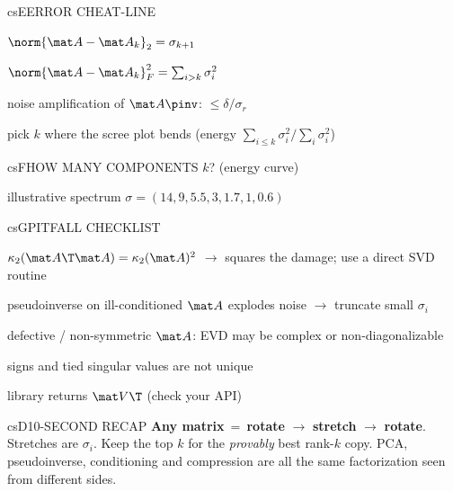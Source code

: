 \documentclass[../../../../master.tex]{subfiles}
\begin{document}
\begin{cscolumns}
\begin{cscard}{csE}{ERROR CHEAT-LINE}
  \begin{csbul}
    \item $\norm{\mat A-\mat A_k}_2=\sigma_{k+1}$
    \item $\norm{\mat A-\mat A_k}_F^2=\sum_{i>k}\sigma_i^2$
    \item noise amplification of $\mat A\pinv$: $\le\delta/\sigma_r$
    \item pick $k$ where the scree plot bends (energy $\sum_{i\le k}\sigma_i^2/\sum_i\sigma_i^2$)
  \end{csbul}
\end{cscard}

\begin{cscard}{csF}{HOW MANY COMPONENTS $k$?  (energy curve)}
  \centering
  \par
  {\scriptsize illustrative spectrum $\sigma=(14,9,5.5,3,1.7,1,0.6)$}
\end{cscard}
\columnbreak

\begin{cscard}{csG}{PITFALL CHECKLIST}
  \begin{csbul}
    \item $\kappa_2(\mat A\T\mat A)=\kappa_2(\mat A)^2$ $\to$ squares the damage; use a direct SVD routine
    \item pseudoinverse on ill-conditioned $\mat A$ explodes noise $\to$ truncate small $\sigma_i$
    \item defective / non-symmetric $\mat A$: EVD may be complex or non-diagonalizable
    \item signs and tied singular values are not unique
    \item library returns $\mat V\T$ (check your API)
  \end{csbul}
\end{cscard}

\begin{cscard}{csD}{10-SECOND RECAP}
  \sffamily\footnotesize
  \textbf{Any matrix} \,=\, \textbf{rotate} $\to$ \textbf{stretch} $\to$ \textbf{rotate}.
  Stretches are $\sigma_i$. Keep the top $k$ for the \emph{provably} best rank-$k$ copy.
  PCA, pseudoinverse, conditioning and compression are all the same factorization seen from different sides.
\end{cscard}
\end{cscolumns}

\csend
\end{document}
